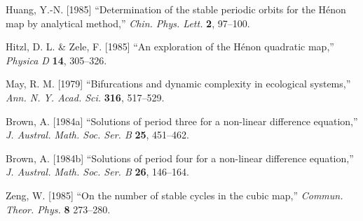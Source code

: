 \documentclass{ws-ijbc}
\begin{document}
\begin{thebibliography}{50}
  Huang, Y.-N. [1985]
  ``Determination of the stable periodic orbits for the H\'enon map by analytical method,''
  {\it Chin. Phys. Lett.}
  \textbf{2},
  97--100.

  Hitzl, D. L. \& Zele, F. [1985]
  ``An exploration of the H\'enon quadratic map,''
  {\it Physica D}
  \textbf{14},
  305--326.

  May, R. M. [1979]
  ``Bifurcations and dynamic complexity in ecological systems,''
  {\it Ann. N. Y. Acad. Sci.}
  \textbf{316},
  517--529.

  Brown, A. [1984a]
  ``Solutions of period three for a non-linear difference equation,''
  {\it J. Austral. Math. Soc. Ser. B}
  \textbf{25},
  451--462.

  Brown, A. [1984b]
  ``Solutions of period four for a non-linear difference equation,''
  {\it J. Austral. Math. Soc. Ser. B}
  \textbf{26},
  146--164.

  Zeng, W. [1985]
  ``On the number of stable cycles in the cubic map,''
  {\it Commun. Theor. Phys.}
  \textbf{8}
  273--280.

\end{thebibliography}


\end{document}
